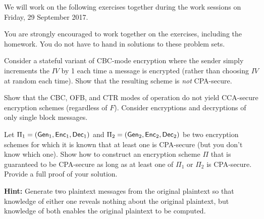 \documentclass[a4paper,10pt,landscape,twocolumn]{scrartcl}
\newcommand\worksession{Friday, 29 September 2017}
\begin{document}
\problems

{\sffamily\noindent
We will work on the following exercises together during the work sessions on \worksession.

You are strongly encouraged to work together on the exercises, including the homework. You do not have to hand in solutions to these problem sets.}

\begin{exercise}
  Consider a stateful variant of CBC-mode encryption where the sender simply increments the $IV$ by 1 each time a message is encrypted (rather than choosing $IV$ at random each time). Show that the resulting scheme is \emph{not} CPA-secure.
\end{exercise}

\begin{exercise}
Show that the CBC, OFB, and CTR modes of operation do not yield CCA-secure encryption schemes (regardless of $F$). Consider encryptions and decryptions of only single block messages.
\end{exercise}

\begin{exercise}
  Let $\Pi_1 = (\mathsf{Gen}_1,\mathsf{Enc}_1, \mathsf{Dec}_1)$ and $\Pi_2 = (\mathsf{Gen}_2,\mathsf{Enc}_2, \mathsf{Dec}_2)$ be two encryption schemes for which it is known that at least one is CPA-secure (but you don't know which one). Show how to construct an encryption scheme $\Pi$ that is guaranteed to be CPA-secure as long as at least one of $\Pi_1$ or $\Pi_2$ is CPA-secure. Provide a full proof of your solution.

  \textbf{Hint:} Generate two plaintext messages from the original plaintext so that knowledge of either one reveals nothing about the original plaintext, but knowledge of both enables the original plaintext to be computed.
\end{exercise}
\end{document}
